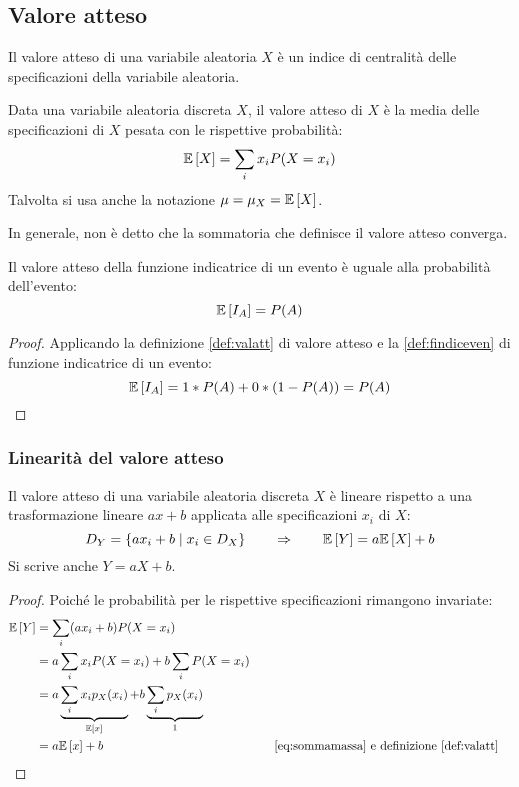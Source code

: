 \subsection{Valore atteso}
Il valore atteso di una variabile aleatoria $X$ è un indice di centralità delle specificazioni della variabile aleatoria.
\begin{defin} \label{def:valatt}
	Data una variabile aleatoria discreta $X$, il valore atteso di $X$ è la media delle specificazioni di $X$ pesata con le rispettive probabilità:
	\begin{equation*}
		\mathbb{E}\left[ X \right]=\sum_i x_i P(X=x_i)
	\end{equation*}
	Talvolta si usa anche la notazione $\mu=\mu_X=\mathbb{E}\left[ X \right]$.
\end{defin}
\noindent
In generale, non è detto che la sommatoria che definisce il valore atteso converga.

\begin{prop} \label{prop:indvalatt}
	Il valore atteso della funzione indicatrice di un evento è uguale alla probabilità dell'evento:
	\begin{equation*}
		\mathbb{E}\left[ I_A \right]=P(A)
	\end{equation*}
\end{prop}
\begin{proof}
	Applicando la definizione \ref{def:valatt} di valore atteso e la \ref{def:findiceven} di funzione indicatrice di un evento:
	\begin{equation*}
		\mathbb{E}\left[ I_A \right]=1*P(A)+0*(1-P(A))=P(A)
	\end{equation*}
\end{proof}

\subsubsection{Linearità del valore atteso}
\begin{prop}
	Il valore atteso di una variabile aleatoria discreta $X$ è lineare rispetto a una trasformazione lineare $ax+b$ applicata alle specificazioni $x_i$ di $X$:
	\begin{equation*}
		D_Y = \{ax_i+b \mid x_i\in D_X\} \qquad\Rightarrow\qquad \mathbb{E}\left[ Y \right]=a\mathbb{E}\left[ X \right]+b
	\end{equation*}
	Si scrive anche $Y=aX+b$.
\end{prop}
\begin{proof}
	Poiché le probabilità per le rispettive specificazioni rimangono invariate:
	\begin{align*}
		\mathbb{E}\left[ Y \right] & = \sum_i (a x_i + b) P(X=x_i)                                                    \\
		       & = a\sum_i x_i P(X=x_i) + b\sum_i P(X=x_i)                                        \\
		       & = a\underbrace{\sum_i x_i p_X(x_i)}_{\mathbb{E}\left[ x \right]} + b\underbrace{\sum_i p_X(x_i)}_{1} \\
		       & = a \mathbb{E}\left[ x \right] + b & \quad & \text{\eqref{eq:sommamassa} e definizione \ref{def:valatt}}
	\end{align*}
\end{proof}



